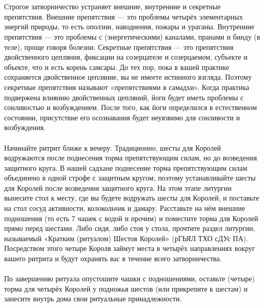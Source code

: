\\ \\ Строгое затворничество устраняет внешние, внутренние и секретные препятствия. Внешние препятствия — это проблемы четырёх элементарных энергий природы, то есть оползни, наводнения, пожары и ураганы. Внутренние препятствия — это проблемы с (энергетическими) каналами, пранами и бинду (в теле), проще говоря болезни. Секретные препятствия — это препятствия двойственного цепляния, фиксации на созерцателе и созерцаемом, субъекте и объекте, что и есть корень самсары. До тех пор, пока в вашей практике сохраняется двойственное цепляние, вы не имеете истинного взгляда. Поэтому секретные препятствия называют «препятствиями в самадхи». Когда практика подвержена влиянию двойственных цепляний, йоги будет иметь проблемы с сонливостью и возбуждением. После того, как йоги определился в естественном состоянии, присутствие его осознавания будет неуязвимо для сонливости и возбуждения.
\\ \\ Начинайте ритрит ближе к вечеру. Традиционно, шесты для Королей водружаются после поднесения торма препятствующим силам, но до возведения защитного круга. В нашей садхане поднесение торма препятствующим силам объединено в одной строфе с защитным кругом, поэтому устанавливайте шесты для Королей после возведения защитного круга. На этом этапе литургии вынесите стол к месту, где вы будете водружать шесты для Королей, и поставьте на стол сосуд активности, колокольчик и дамару. Расставьте на нём внешние подношения (то есть 7 чашек с водой и прочим) и поместите торма для Королей прямо перед шестами. Либо сидя, либо стоя у стола, прочтите раздел литургии, называемый «Кратким (ритуалом) Шестов Королей» (рГЬЯЛ ТХО сДУс ПА). Посредством этого четыре Короля займут места в четырёх направлениях вокруг вашего ритрита и будут охранять вас в течение всего затворничества.
\\ \\ По завершению ритуала опустошите чашки с подношениями, оставьте (четыре) торма для четырёх Королей у подножья шестов (или прикрепите к шестам) и занесите внутрь дома свои ритуальные принадлежности.
